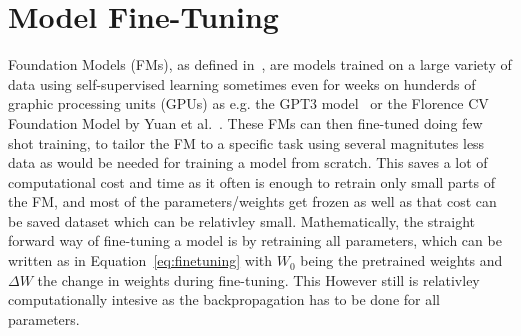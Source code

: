 






\section{Model Fine-Tuning}\label{sec:model-fine-tuning}
Foundation Models (FMs), as defined in~\cite{Bommasani2021}, are models trained on a large variety of data using self-supervised learning sometimes even for weeks on hunderds of graphic processing units (GPUs) as e.g. the GPT3 model~\cite{Yuan2022} or the Florence CV Foundation Model by Yuan et al.~\cite{Yuan2021}.
These FMs can then fine-tuned doing few shot training, to tailor the FM to a specific task using several magnitutes less data as would be needed for training a model from scratch.
This saves a lot of computational cost and time as it often is enough to retrain only small parts of the FM, and most of the parameters/weights get frozen as well as that cost can be saved dataset which can be relativley small.
Mathematically, the straight forward way of fine-tuning a model is by retraining all parameters, which can be written as in Equation~\ref{eq:finetuning} with $W_0$ being the pretrained weights and $\Delta W$ the change in weights during fine-tuning.
This However still is relativley computationally intesive as the backpropagation has to be done for all parameters.

